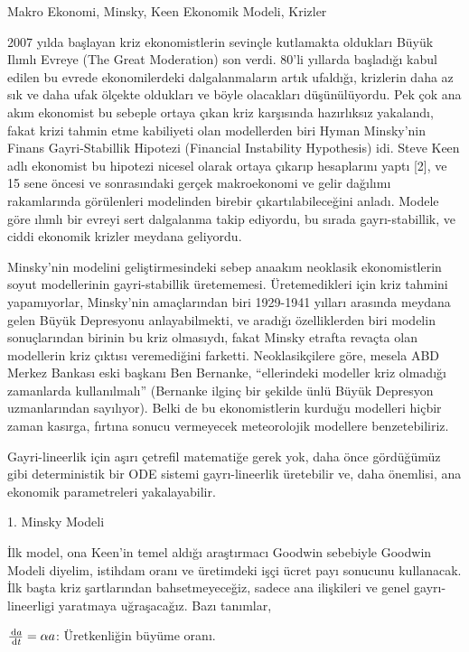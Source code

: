 \documentclass[12pt,fleqn]{article}\usepackage{../../common}
\begin{document}
Makro Ekonomi, Minsky, Keen Ekonomik Modeli, Krizler

2007 yılda başlayan kriz ekonomistlerin sevinçle kutlamakta oldukları Büyük
Ilımlı Evreye (The Great Moderation) son verdi. 80'li yıllarda başladığı
kabul edilen bu evrede ekonomilerdeki dalgalanmaların artık ufaldığı,
krizlerin daha az sık ve daha ufak ölçekte oldukları ve böyle olacakları
düşünülüyordu. Pek çok ana akım ekonomist bu sebeple ortaya çıkan kriz
karşısında hazırlıksız yakalandı, fakat krizi tahmin etme kabiliyeti olan
modellerden biri Hyman Minsky'nin Finans Gayri-Stabillik Hipotezi
(Financial Instability Hypothesis) idi. Steve Keen adlı ekonomist bu
hipotezi nicesel olarak ortaya çıkarıp hesaplarını yaptı [2], ve 15 sene
öncesi ve sonrasındaki gerçek makroekonomi ve gelir dağılımı rakamlarında
görülenleri modelinden birebir çıkartılabileceğini anladı. Modele göre
ılımlı bir evreyi sert dalgalanma takip ediyordu, bu sırada
gayrı-stabillik, ve ciddi ekonomik krizler meydana geliyordu.

Minsky'nin modelini geliştirmesindeki sebep anaakım neoklasik
ekonomistlerin soyut modellerinin gayri-stabillik
üretememesi. Üretemedikleri için kriz tahmini yapamıyorlar, Minsky'nin
amaçlarından biri 1929-1941 yılları arasında meydana gelen Büyük Depresyonu
anlayabilmekti, ve aradığı özelliklerden biri modelin sonuçlarından birinin
bu kriz olmasıydı, fakat Minsky etrafta revaçta olan modellerin kriz
çıktısı veremediğini farketti.  Neoklasikçilere göre, mesela ABD Merkez
Bankası eski başkanı Ben Bernanke, ``ellerindeki modeller kriz olmadığı
zamanlarda kullanılmalı'' (Bernanke ilginç bir şekilde ünlü Büyük Depresyon
uzmanlarından sayılıyor). Belki de bu ekonomistlerin kurduğu modelleri
hiçbir zaman kasırga, fırtına sonucu vermeyecek meteorolojik modellere
benzetebiliriz.

Gayri-lineerlik için aşırı çetrefil matematiğe gerek yok, daha önce
gördüğümüz gibi deterministik bir ODE sistemi gayrı-lineerlik üretebilir ve,
daha önemlisi, ana ekonomik parametreleri yakalayabilir. 

1. Minsky Modeli

İlk model, ona Keen'in temel aldığı araştırmacı Goodwin sebebiyle Goodwin
Modeli diyelim, istihdam oranı ve üretimdeki işçi ücret payı sonucunu
kullanacak. İlk başta kriz şartlarından bahsetmeyeceğiz, sadece ana
ilişkileri ve genel gayrı-lineerligi yaratmaya uğraşacağız. Bazı tanımlar,

$\frac{\,\mathrm{d} a}{\,\mathrm{d} t} = \alpha a$: Üretkenliğin büyüme oranı.
\end{document}
